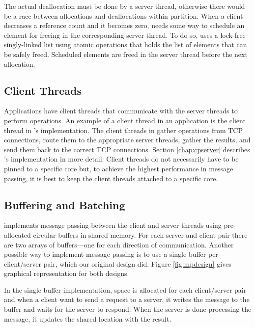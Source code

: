 The actual deallocation must be done by a server thread, otherwise there would
be a race between allocations and deallocations within partition. When a client
decreases a reference count and it becomes zero, \cphash{} needs some way to
schedule an element for freeing in the corresponding server thread.  To do so,
\cphash{} uses a lock-free singly-linked list using atomic operations that holds
the list of elements that can be safely freed. Scheduled elements are freed in
the server thread before the next allocation.


\subsection{Client Threads}
\label{sec:clientthreads}

Applications have client threads that communicate with the server threads to
perform operations. An example of a client thread in an application is the
client thread in \cpserver{}'s implementation. The client threads in \cpserver{}
gather operations from TCP connections, route them to the appropriate server
threads, gather the results, and send them back to the correct TCP
connections. Section \ref{chap:cpserver} describes \cpserver{}'s implementation
in more detail.  Client threads do not necessarily have to be pinned to a
specific core but, to achieve the highest performance in message passing, it is
best to keep the client threads attached to a specific core.

\subsection{Buffering and Batching}
\label{sec:msgpassing}

\cphash{} implements message passing between the client and server threads using
pre-allocated circular buffers in shared memory.  For each server and client
pair there are two arrays of buffers---one for each direction of
communication. Another possible way to implement message passing is to use a
single buffer per client/server pair, which our original design did.  Figure
\ref{fig:mpdesign} gives graphical representation for both designs.

In the single buffer implementation, space is allocated for each client/server
pair and when a client want to send a request to a server, it writes the message
to the buffer and waits for the server to respond. When the server is done
processing the message, it updates the shared location with the result.

